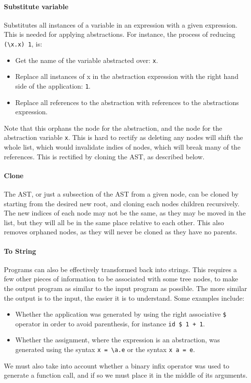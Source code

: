\paragraph{Substitute variable} Substitutes all instances of a variable in an expression with a given expression. This is needed for applying abstractions. For instance, the process of reducing \verb|(\x.x) 1|, is:
\begin{itemize}
    \item Get the name of the variable abstracted over: \verb|x|.
    \item Replace all instances of x in the abstraction expression with the right hand side of the application: \verb|1|.
    \item Replace all references to the abstraction with references to the abstractions expression. 
\end{itemize}

Note that this orphans the node for the abstraction, and the node for the abstraction variable \verb|x|. This is hard to rectify as deleting any nodes will shift the whole list, which would invalidate indies of nodes, which will break many of the references. This is rectified by cloning the AST, as described below.

\paragraph{Clone} The AST, or just a subsection of the \ac{AST} from a given node, can be cloned by starting from the desired new root, and cloning each nodes children recursively. The new indices of each node may not be the same, as they may be moved in the list, but they will all be in the same place relative to each other. This also removes orphaned nodes, as they will never be cloned as they have no parents. 

\paragraph{To String} \label{paragraph:to_string} Programs can also be effectively transformed back into strings. This requires a few other pieces of information to be associated with some tree nodes, to make the output program as similar to the input program as possible. The more similar the output is to the input, the easier it is to understand. Some examples include:
\begin{itemize}
    \item Whether the application was generated by using the right associative \verb|$| operator in order to avoid parenthesis, for instance \verb|id $ 1 + 1|. 
    \item Whether the assignment, where the expression is an abstraction, was generated using the syntax \verb|x = \a.e| or the syntax \verb|x a = e|. 
\end{itemize}
We must also take into account whether a binary infix operator was used to generate a function call, and if so we must place it in the middle of its arguments. 

